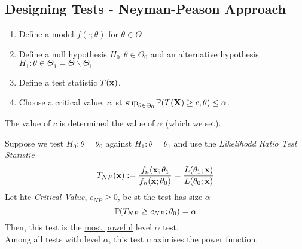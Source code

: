\documentclass[11pt,a4paper]{article}
\begin{document}
\subsection{Designing Tests - Neyman-Peason Approach}

\begin{enumerate}[label=\roman*)]
	\item Define a model $f(\cdot;\theta)$ for $\theta\in\Theta$
	\item Define a null hypothesis $H_0:\theta\in\Theta_0$ and an alternative hypothesis $H_1:\theta\in\Theta_1=\Theta\backslash\Theta_1$
	\item Define a test statistic $T(\textbf{x})$.
	\item Choose a critical value, $c$, st $\sup_{\theta\in\Theta_0}\mathbb{P}(T(\textbf{X})\geq c;\theta)\leq\alpha$.
\end{enumerate}
\nb The value of $c$ is determined the value of $\alpha$ (which we set).

Suppose we test $H_0:\theta=\theta_0$ against $H_1:\theta=\theta_1$ and use the \textit{Likelihodd Ratio Test Statistic}
$$T_{NP}(\textbf{x}):=\frac{f_n(\textbf{x};\theta_1}{f_n(\textbf{x};\theta_0)}=\frac{L(\theta_1;\textbf{x})}{L(\theta_0;\textbf{x})}$$
Let hte \textit{Critical Value}, $c_{NP}\geq0$, be st the test has size $\alpha$
$$\mathbb{P}(T_{NP}\geq c_{NP};\theta_0)=\alpha$$
Then, this test is the \underline{most poweful} level $\alpha$ test.\\
\ie Among all tests with level $\alpha$, this test maximises the power function.\\
\end{document}
